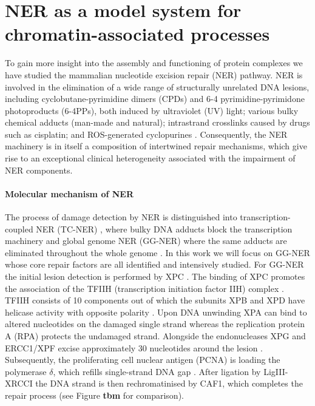 \section{NER as a model system for chromatin-associated processes}
\label{sec:NERexperiments}
To gain more insight into the assembly and functioning of protein complexes we have studied the mammalian nucleotide excision repair (NER) pathway. NER is involved in the elimination of a wide range of structurally unrelated DNA lesions, including cyclobutane-pyrimidine dimers (CPDs) and 6-4 pyrimidine-pyrimidone photoproducts (6-4PPs), both induced by ultraviolet (UV) light; various bulky chemical adducts (man-made and natural); intrastrand crosslinks caused by drugs such as cisplatin; and ROS-generated cyclopurines \cite{Marteijn2014}. Consequently, the NER machinery is in itself a composition of intertwined repair mechanisms, which give rise to an exceptional clinical heterogeneity associated with the impairment of NER components.


\paragraph{Molecular mechanism of NER}
The process of damage detection by NER is distinguished into transcription-coupled NER (TC-NER) \cite{Sugasawa:2005:Cell:15882621,Gillet:2006:Chem-Rev:16464005}, where bulky DNA adducts block the transcription machinery and global genome NER (GG-NER) where the same adducts are eliminated throughout the whole genome \cite{Fousteri2008}. In this work we will focus on GG-NER whose core repair factors are all identified and intensively studied. For GG-NER the initial lesion detection is performed by XPC \cite{Sugasawa:1998:Mol-Cell:9734359,Volker2001}. The binding of XPC promotes the association of the TFIIH (transcription initiation factor IIH) complex \cite{Yokoi:2000:J-Biol-Chem:10734143,Riedl2003,Volker2001}. TFIIH consists of 10 components out of which the subunits XPB and XPD have helicase activity with opposite polarity \cite{Tapias2004,Compe2012}. Upon DNA unwinding XPA can bind to altered nucleotides on the damaged single strand whereas the replication protein A (RPA) protects the undamaged strand. Alongside the endonucleases XPG and ERCC1/XPF excise approximately 30 nucleotides around the lesion \cite{Evans1997,deLaat:1998:Genes-Dev:9716411,Wakasugi:1997:J-Biol-Chem:9188507,Park:2006:FEBS-J:16623697,Camenisch:2006:Nat-Struct-Mol-Biol:16491090}. Subsequently, the proliferating cell nuclear antigen (PCNA) is loading the polymerase $\delta$, which refills single-strand DNA gap \cite{Hoeijmakers:2001:Nature:11357144,Essers2005,Moser:2007:Mol-Cell:17643379}. After ligation by LigIII-XRCCI the DNA strand is then rechromatinised by CAF1, which completes the repair process \cite{Green:2003:EMBO-J:14517254,Polo2006} (see Figure \textbf{tbm} for comparison). 


